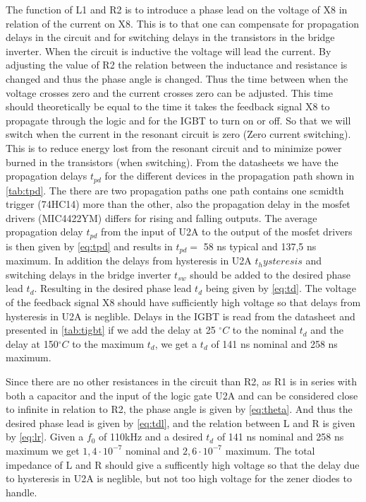 The function of L1 and R2 is to introduce a phase lead on the voltage of X8 in relation of the current on X8. This is to that one can compensate for propagation delays in the circuit and for switching delays in the transistors in the bridge inverter. When the circuit is inductive the voltage will lead the current. By adjusting the value of R2 the relation between the inductance and resistance is changed and thus the phase angle is changed. Thus the time between when the voltage crosses zero and the current crosses zero can be adjusted. This time should theoretically be equal to the time it takes the feedback signal X8 to propagate through the logic and for the IGBT to turn on or off. So that we will switch when the current in the resonant circuit is zero (Zero current switching). This is to reduce energy lost from the resonant circuit and to minimize power burned in the transistors (when switching). From the datasheets we have the propagation delays $t_{pd}$ for the different devices in the propagation path shown in \cref{tab:tpd}. The there are two propagation paths one path contains one scmidth trigger (74HC14) more than the other, also the propagation delay in the mosfet drivers (MIC4422YM) differs for rising and falling outputs. The average propagation delay $t_{pd}$ from the input of U2A to the output of the mosfet drivers is then given by \cref{eq:tpd} and results in $t_{pd} =$ 58 ns typical and 137,5 ns maximum. In addition the delays from hysteresis in U2A $t_hysteresis$ and switching delays in the bridge inverter $t_{sw}$ should be added to the desired phase lead $t_{d}$. Resulting in the desired phase lead $t_{d}$ being given by \cref{eq:td}. The voltage of the feedback signal X8 should have sufficiently high voltage so that delays from hysteresis in U2A is neglible. Delays in the IGBT is read from the datasheet and presented in \cref{tab:tigbt} if we add the delay at 25 $^{\circ}C$ to the nominal $t_d$ and the delay at 150$^{\circ}C$ to the maximum $t_d$, we get a $t_d$ of 141 ns nominal and 258 ns maximum.

Since there are no other resistances in the circuit than R2, as R1 is in series with both a capacitor and the input of the logic gate U2A and can be considered close to infinite in relation to R2, the phase angle is given by \cref{eq:theta}. And thus the desired phase lead is given by \cref{eq:tdl}, and the relation between L and R is given by \cref{eq:lr}. Given a $f_0$ of 110kHz and a desired $t_d$ of 141 ns nominal and 258 ns maximum we get $1,4 \cdot 10^{-7}$ nominal and $2,6 \cdot 10^{-7}$ maximum. The total impedance of L and R should give a sufficently high voltage so that the delay due to hysteresis in U2A is neglible, but not too high voltage for the zener diodes to handle. 

